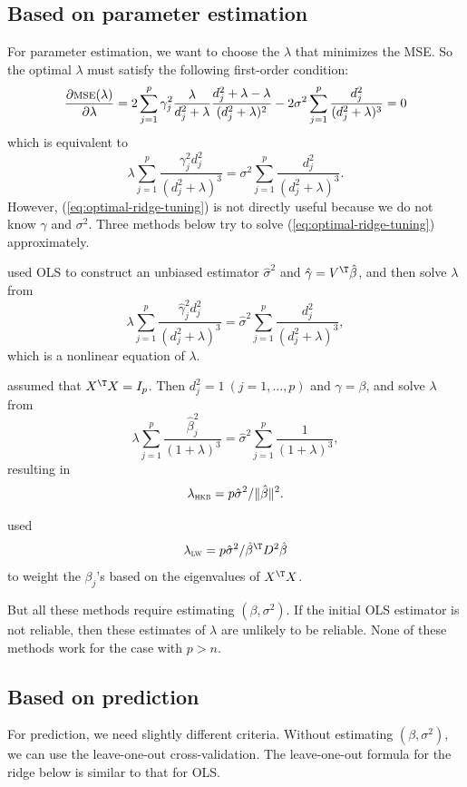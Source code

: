 \subsection{Based on parameter estimation}
For parameter estimation, we want to choose the $\lambda$ that minimizes the MSE.
So the optimal $\lambda$ must satisfy the following first-order condition:
$$
\frac{\partial\textsc{mse}(\lambda)}{\partial\lambda}  =2\sum_{j=1}^{p}\gamma_{j}^{2}\frac{\lambda}{ d_j^2 +\lambda}\frac{ d_j^2 +\lambda-\lambda}{( d_j^2 +\lambda)^{2}}-2\sigma^{2}\sum_{j=1}^{p}\frac{ d_j^2 }{( d_j^2 +\lambda)^{3}}=0
$$
which is equivalent to
\begin{equation}
\lambda  \sum_{j=1}^{p}\frac{\gamma_{j}^{2} d_j^2 }{( d_j^2 +\lambda)^{3}}=\sigma^{2}\sum_{j=1}^{p}\frac{ d_j^2 }{( d_j^2 +\lambda)^{3}}.\label{eq:optimal-ridge-tuning}
\end{equation}
However, (\ref{eq:optimal-ridge-tuning}) is not directly useful because
we do not know $\gamma$ and $\sigma^{2}$. Three methods below try
to solve (\ref{eq:optimal-ridge-tuning}) approximately. 

\citet{dempster1977simulation} used OLS to construct an unbiased estimator
$\hat{\sigma}^{2}$ and $\hat{\gamma}=V^{\T} \hat{\beta}$, and then
solve $\lambda$ from
\[
\lambda\sum_{j=1}^{p}\frac{\hat{\gamma}_{j}^{2} d_j^2 }{( d_j^2 +\lambda)^{3}}=\hat{\sigma}^{2}\sum_{j=1}^{p}\frac{ d_j^2 }{( d_j^2 +\lambda)^{3}},
\]
which is a nonlinear equation of $\lambda$. 

\citet{hoerl1975ridge} assumed that $X^{\T}X=I_{p}$. Then $ d_j^2 =1\ (j=1,\ldots,p)$
and $\gamma=\beta$, and solve $\lambda$ from
\[
\lambda\sum_{j=1}^{p}\frac{\hat{\beta}_{j}^{2}}{(1+\lambda)^{3}}=\hat{\sigma}^{2}\sum_{j=1}^{p}\frac{1}{(1+\lambda)^{3}},
\]
resulting in
\[
\lambda_{\textsc{hkb}}=p\hat{\sigma}^{2}/\|\hat{\beta}\|^{2}.
\]

\citet{jf1976simulation} used
\[
\lambda_{\textsc{lw}}=p\hat{\sigma}^{2}/\hat{\beta}^{\T}D^2 \hat{\beta}
\]
to weight the $\beta_j$'s based on the eigenvalues of $X^{\T} X$. 

But all these methods require estimating $(\beta,\sigma^{2})$. If
the initial OLS estimator is not reliable, then these estimates of
$\lambda$ are unlikely to be reliable. None of these methods work for the case with $p > n$. 


\subsection{Based on prediction}
For prediction, we need slightly different criteria. 
Without estimating $(\beta,\sigma^{2})$, we can use the leave-one-out cross-validation. The leave-one-out formula for the ridge below is similar to that for OLS.


